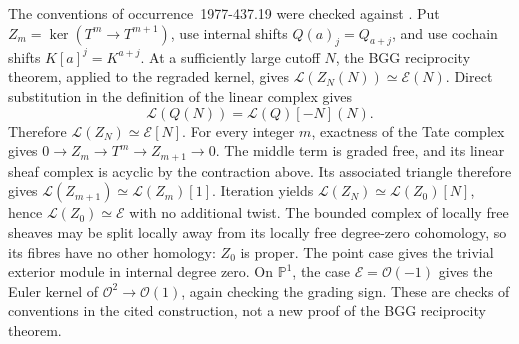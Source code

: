 \begin{remark}\ours{}
The conventions of occurrence~1977-437.19 were checked against
\citet[\S2, Corollary~2.4, Theorem~3.7 and \S4]{eisenbudfloystadschreyer2003exterior}.
Put \(Z_m=\ker(T^m\to T^{m+1})\), use internal shifts
\(Q(a)_j=Q_{a+j}\), and use cochain shifts \(K[a]^j=K^{a+j}\).
At a sufficiently large cutoff \(N\), the BGG reciprocity theorem,
applied to the regraded kernel, gives
\(\mathcal L(Z_N(N))\simeq\mathcal E(N)\).
Direct substitution in the definition of the linear complex gives
\[
 \mathcal L(Q(N))=\mathcal L(Q)[-N](N).
\]
Therefore \(\mathcal L(Z_N)\simeq\mathcal E[N]\).
For every integer \(m\), exactness of the Tate complex gives
\(0\to Z_m\to T^m\to Z_{m+1}\to0\).
The middle term is graded free, and its linear sheaf complex is acyclic
by the contraction above. Its associated triangle therefore gives
\(\mathcal L(Z_{m+1})\simeq\mathcal L(Z_m)[1]\).
Iteration yields \(\mathcal L(Z_N)\simeq\mathcal L(Z_0)[N]\), hence
\(\mathcal L(Z_0)\simeq\mathcal E\) with no additional twist.
The bounded complex of locally free sheaves may be split locally away
from its locally free degree-zero cohomology, so its fibres have no
other homology: \(Z_0\) is proper. The point case gives the trivial
exterior module in internal degree zero. On \(\mathbb P^1\), the case
\(\mathcal E=\mathcal O(-1)\) gives the Euler kernel of
\(\mathcal O^2\to\mathcal O(1)\), again checking the grading sign.
These are checks of conventions in the cited construction, not a new
proof of the BGG reciprocity theorem.
\end{remark}

